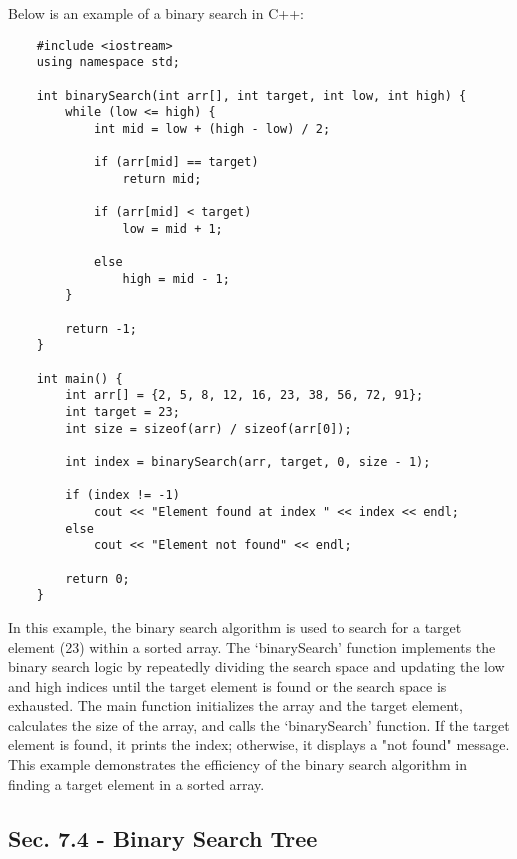 \begin{solution}
    Below is an example of a binary search in C++:

    \horizontalline

    \begin{verbatim}
    #include <iostream>
    using namespace std;
    
    int binarySearch(int arr[], int target, int low, int high) {
        while (low <= high) {
            int mid = low + (high - low) / 2;
            
            if (arr[mid] == target)
                return mid;
            
            if (arr[mid] < target)
                low = mid + 1;
            
            else
                high = mid - 1;
        }
        
        return -1;
    }
    
    int main() {
        int arr[] = {2, 5, 8, 12, 16, 23, 38, 56, 72, 91};
        int target = 23;
        int size = sizeof(arr) / sizeof(arr[0]);
        
        int index = binarySearch(arr, target, 0, size - 1);
        
        if (index != -1)
            cout << "Element found at index " << index << endl;
        else
            cout << "Element not found" << endl;
        
        return 0;
    }
    \end{verbatim}

    \horizontalline

    In this example, the binary search algorithm is used to search for a target element (23) within a sorted array. The `binarySearch' function implements the binary search logic by repeatedly dividing the search space and updating the low and high indices until the target element is found or the search space is exhausted. 
    The main function initializes the array and the target element, calculates the size of the array, and calls the `binarySearch' function. If the target element is found, it prints the index; otherwise, it displays a "not found" message. This example demonstrates the efficiency of the binary search algorithm in finding 
    a target element in a sorted array.
\end{solution}

\subsection*{Sec. 7.4 - Binary Search Tree}

